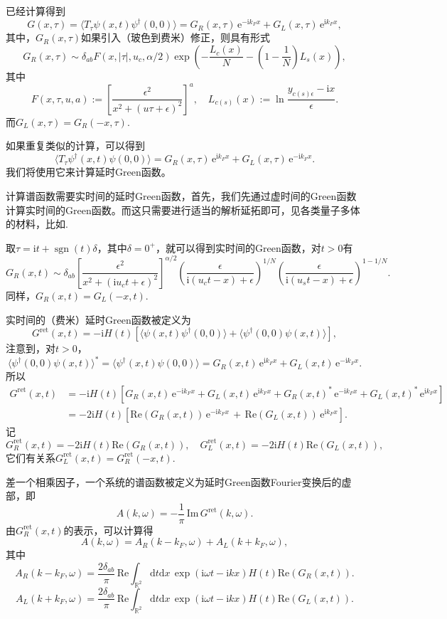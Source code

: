\documentclass[9pt]{extarticle}
\newcommand{\ee}{\mathrm{e}}
\newcommand{\ii}{\mathrm{i}}
\newcommand{\rr}{\mathbb{R}}
\newcommand{\dd}{\mathrm{d}}
\DeclareMathOperator{\sgn}{sgn}
\begin{document}
已经计算得到
\[
	G(x,\tau)=\langle T_\tau \psi(x,t)\psi^\dag(0,0)\rangle=G_R(x,\tau)\,\ee^{-\ii k_F x}+G_L(x,\tau)\,\ee^{\ii k_F x},
\]
其中，$G_R(x,\tau)$如果引入（玻色到费米）修正，则具有形式
\[
	G_R(x,\tau)\sim \delta_{ab}F\left(x,|\tau|,u_c,\alpha /2\right)\exp\left(-\frac {L_c(x)} N -\left(1-\frac 1 N\right) L_s(x)\right),
\]
其中
\[
	F(x,\tau,u,a):=\left[\frac{\epsilon^2}{x^2+(u\tau+\epsilon)^2}\right]^{a},\quad L_{c(s)}(x):=\ln \frac{y_{c(s)\epsilon}-\ii x}{\epsilon}.
\]
而$G_L(x,\tau)=G_R(-x,\tau)$. 

如果重复类似的计算，可以得到
\[
	\langle T_\tau \psi^\dag(x,t)\psi(0,0)\rangle = G_R(x,\tau)\,\ee^{\ii k_F x}+G_L(x,\tau)\,\ee^{-\ii k_F x}.
\]
我们将使用它来计算延时Green函数。

计算谱函数需要实时间的延时Green函数，首先，我们先通过虚时间的Green函数计算实时间的Green函数。而这只需要进行适当的解析延拓即可，见各类量子多体的材料，比如\cite{giamarchi2004quantum}.

取$\tau =\ii t +\sgn(t)\delta$，其中$\delta=0^+$，就可以得到实时间的Green函数，对$t>0$有
\[
	G_R(x,t)\sim \delta_{ab}\left[\frac{\epsilon^2}{x^2+(\ii u_c t+\epsilon)^2}\right]^{\alpha/2}\left(\frac{\epsilon}{\ii(u_ct-x)+\epsilon}\right)^{1/N}\left(\frac{\epsilon}{\ii(u_st-x)+\epsilon}\right)^{1-1/N}.
\]
同样，$G_R(x,t)=G_L(-x,t)$.

实时间的（费米）延时Green函数被定义为
\[
	G^\text{ret}(x,t)=-\ii H(t)\left[\langle \psi(x,t)\psi^\dag(0,0)\rangle+\langle \psi^\dag(0,0)\psi(x,t)\rangle\right],
\]
注意到，对$t>0$，
\[
	\langle \psi^\dag(0,0)\psi(x,t)\rangle^*=\langle \psi^\dag(x,t)\psi(0,0)\rangle=G_R(x,t)\,\ee^{\ii k_F x}+G_L(x,t)\,\ee^{-\ii k_F x}.
\]
所以
\begin{align*}
	G^\text{ret}(x,t)&=-\ii H(t)\left[G_R(x,t)\,\ee^{-\ii k_F x}+G_L(x,t)\,\ee^{\ii k_F x}+G_R(x,t)^*\,\ee^{-\ii k_F x}+G_L(x,t)^*\,\ee^{\ii k_F x}\right]\\
	&=-2\ii H(t)\left[\mathrm{Re}(G_R(x,t))\,\ee^{-\ii k_F x}\,+\,\mathrm{Re}(G_L(x,t))\,\ee^{\ii k_F x}\right].
\end{align*}
记
\[
	G^\text{ret}_R(x,t)=-2\ii H(t)\mathrm{Re}(G_R(x,t)),\quad 	G^\text{ret}_L(x,t)=-2\ii H(t)\mathrm{Re}(G_L(x,t)),
\]
它们有关系$G^\text{ret}_L(x,t)=G^\text{ret}_R(-x,t)$.

差一个相乘因子，一个系统的谱函数被定义为延时Green函数Fourier变换后的虚部，即
\[
	A(k,\omega)=-\frac{1}{\pi}\,\mathrm{Im}\,G^\text{ret}(k,\omega).
\]
由$G^\text{ret}_R(x,t)$的表示，可以计算得
\[
	A(k,\omega)=A_R(k-k_F,\omega)+A_L(k+k_F,\omega),
\]
其中
\[
	A_{R}(k-k_F,\omega)=\frac{2\delta_{ab}}{\pi}\, \mathrm{Re}\int_{\rr^2}\dd t\dd x\, \exp(\ii \omega t-\ii k x)H(t)\mathrm{Re}(G_R(x,t)).
\]
\[
	A_{L}(k+k_F,\omega)=\frac{2\delta_{ab}}{\pi}\, \mathrm{Re}\int_{\rr^2}\dd t\dd x\, \exp(\ii \omega t-\ii k x)H(t)\mathrm{Re}(G_L(x,t)).
\]
\end{document}
